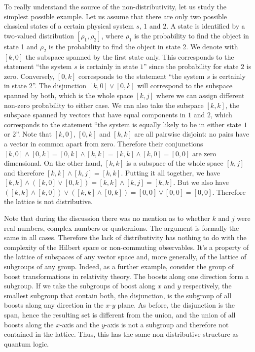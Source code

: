 \documentclass[11pt, executivepaper]{article}
\begin{document}
To really understand the source of the non-distributivity, let us study the simplest possible example. Let us assume that there are only two possible classical states of a certain physical system $s$, $1$ and $2$. A state is identified by a two-valued distribution $[\rho_1, \rho_2]$, where $\rho_1$ is the probability to find the object in state 1 and $\rho_2$ is the probability to find the object in state 2. We denote with $[k,0]$ the subspace spanned by the first state only. This corresponds to the statement ``the system $s$ is certainly in state $1$'' since the probability for state $2$ is zero. Conversely, $[0,k]$ corresponds to the statement ``the system $s$ is certainly in state $2$''. The disjunction $[k,0] \vee [0,k]$ will correspond to the subspace spanned by both, which is the whole space $[k,j]$ where we can assign different non-zero probability to either case. We can also take the subspace $[k,k]$, the subspace spanned by vectors that have equal components in $1$ and $2$, which corresponds to the statement ``the system is equally likely to be in either state $1$ or $2$''. Note that $[k,0]$, $[0,k]$ and $[k,k]$ are all pairwise disjoint: no pairs have a vector in common apart from zero. Therefore their conjunctions $[k,0] \wedge [0,k] = [0,k] \wedge [k,k] = [k,k] \wedge [k,0] = [0,0]$ are zero dimensional. On the other hand, $[k,k]$ is a subspace of the whole space $[k,j]$ and therefore $[k,k] \wedge [k,j] = [k,k]$. Putting it all together, we have $[k,k] \wedge ( [k,0] \vee [0,k] ) = [k,k] \wedge [k,j] = [k,k]$. But we also have $( [k,k] \wedge [k,0] ) \vee ( [k,k] \wedge [0,k] ) = [0,0] \vee [0,0] = [0,0]$. Therefore the lattice is not distributive.

Note that during the discussion there was no mention as to whether $k$ and $j$ were real numbers, complex numbers or quaternions. The argument is formally the same in all cases. Therefore the lack of distributivity has nothing to do with the complexity of the Hilbert space or non-commuting observables. It's a property of the lattice of subspaces of any vector space and, more generally, of the lattice of subgroups of any group. Indeed, as a further example, consider the group of boost transformations in relativity theory. The boosts along one direction form a subgroup. If we take the subgroups of boost along $x$ and $y$ respectively, the smallest subgroup that contain both, the disjunction, is the subgroup of all boosts along any direction in the $x$-$y$ plane. As before, the disjunction is the span, hence the resulting set is different from the union, and the union of all boosts along the $x$-axis and the $y$-axis is not a subgroup and therefore not contained in the lattice. Thus, this has the same non-distributive structure as quantum logic.
\end{document}
